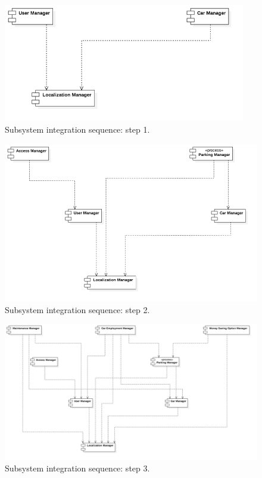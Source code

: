 		\begin{figure}[h]
			\par\bigskip
			\includegraphics[width=300pt,center]{img/integration_strategy/steps/high_level_components_lv1.png}
			\caption{Subsystem integration sequence: step 1.}
		\end{figure}
		\FloatBarrier

		\begin{figure}[h]
			\par\bigskip
			\includegraphics[width=400pt,center]{img/integration_strategy/steps/high_level_components_lv2.png}
			\caption{Subsystem integration sequence: step 2.}
		\end{figure}
		\FloatBarrier

		\begin{figure}[h]
				\par\bigskip
				\includegraphics[width=\textwidth,center]{img/integration_strategy/steps/high_level_components_lv3.png}
				\caption{Subsystem integration sequence: step 3.}
			\end{figure}
		\FloatBarrier

